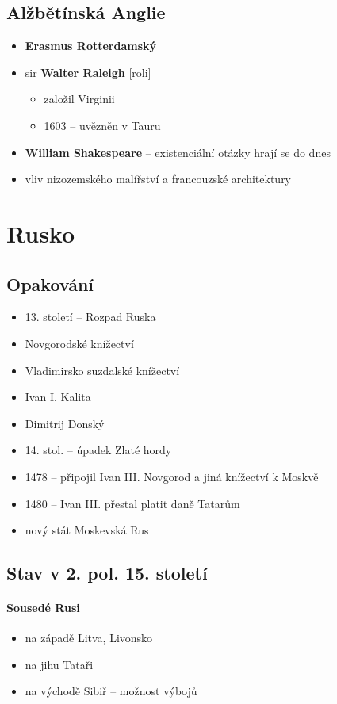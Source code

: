 \subsection{Alžbětínská Anglie}
\begin{itemize}
\item \textbf{Erasmus Rotterdamský}
\item sir \textbf{Walter Raleigh} [roli]
	\begin{itemize}
	\item založil Virginii
	\item 1603 -- uvězněn v Tauru
	\end{itemize}
\item \textbf{William Shakespeare} -- existenciální otázky \ra hrají se do dnes
\item vliv nizozemského malířství a francouzské architektury
\end{itemize}

\section{Rusko}
\subsection{Opakování}
\begin{itemize}
\item 13. století -- Rozpad Ruska 
\item Novgorodské knížectví
\item Vladimirsko suzdalské knížectví
\item Ivan I. Kalita
\item Dimitrij Donský
\item 14. stol. -- úpadek Zlaté hordy
\item 1478 -- připojil Ivan III. Novgorod a jiná knížectví k Moskvě
\item 1480 -- Ivan III. přestal platit daně Tatarům
\item nový stát Moskevská Rus
\end{itemize}

\subsection{Stav v 2. pol. 15. století}
\paragraph{Sousedé Rusi}
\begin{itemize}
\item na západě Litva, Livonsko
\item na jihu Tataři
\item na východě Sibiř -- možnost výbojů
\end{itemize}

